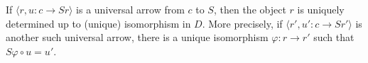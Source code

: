 If $\langle r, u: c \rightarrow Sr\rangle$ is a universal arrow from $c$ to $S$, then the object $r$ is uniquely determined up to (unique) isomorphism in $D$. More precisely, if $\langle r', u': c \rightarrow Sr'\rangle$ is another such universal arrow, there is a unique isomorphism $\varphi: r \rightarrow r'$ such that $S\varphi \circ u = u'$.